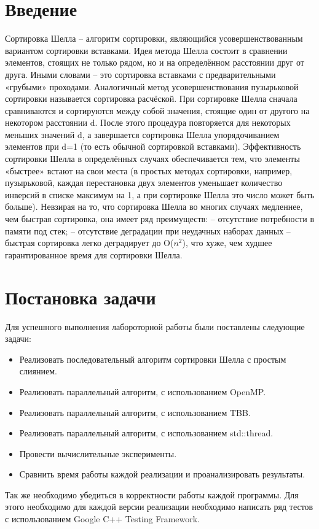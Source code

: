 \documentclass{report}
\begin{document}
\setcounter{page}{2}

\tableofcontents
\newpage

\section*{Введение}
\par Сортировка Шелла – алгоритм сортировки, являющийся усовершенствованным вариантом сортировки вставками. Идея метода Шелла состоит в сравнении элементов, стоящих не только рядом, но и на определённом расстоянии друг от друга. Иными словами – это сортировка вставками с предварительными «грубыми» проходами. Аналогичный метод усовершенствования пузырьковой сортировки называется сортировка расчёской.
При сортировке Шелла сначала сравниваются и сортируются между собой значения, стоящие один от другого на некотором расстоянии d. После этого процедура повторяется для некоторых меньших значений d, а завершается сортировка Шелла упорядочиванием элементов при d=1 (то есть обычной сортировкой вставками). Эффективность сортировки Шелла в определённых случаях обеспечивается тем, что элементы «быстрее» встают на свои места (в простых методах сортировки, например, пузырьковой, каждая перестановка двух элементов уменьшает количество инверсий в списке максимум на 1, а при сортировке Шелла это число может быть больше).
Невзирая на то, что сортировка Шелла во многих случаях медленнее, чем быстрая сортировка, она имеет ряд преимуществ:
– отсутствие потребности в памяти под стек;
– отсутствие деградации при неудачных наборах данных – быстрая сортировка легко деградирует до O($n^2$), что хуже, чем худшее гарантированное время для сортировки Шелла.
 
\newpage

\section*{Постановка задачи}
\par Для успешного выполнения лабороторной работы были поставлены следующие задачи:
\begin{itemize}
\item Реализовать последовательный алгоритм сортировки Шелла с простым слиянием.
\item Реализовать параллельный алгоритм, с использованием OpenMP.
\item Реализовать параллельный алгоритм, с использованием TBB.
\item Реализовать параллельный алгоритм, с использованием std::thread.
\item Провести вычислительные эксперименты.
\item Сравнить время работы каждой реализации и проанализировать результаты.
\end{itemize}
Так же необходимо убедиться в корректности работы каждой программы. Для этого необходимо для каждой версии реализации необходимо написать ряд тестов с использованием Google C++ Testing Framework.
\newpage
\end{document}
